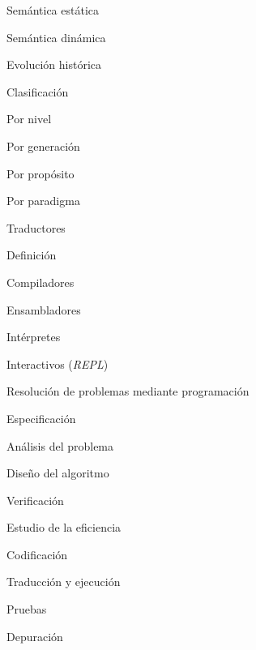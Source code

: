 \begin{longenum}
\begin{longenum}
\begin{longenum}
\begin{longenum}
\begin{longenum}
                \end{longenum}
                \item Semántica estática
                \item Semántica dinámica
            \end{longenum}
            \item Evolución histórica
            \item Clasificación
            \begin{longenum}
                \item Por nivel
                \item Por generación
                \item Por propósito
                \item Por paradigma
            \end{longenum}
        \end{longenum}
        \item Traductores
        \begin{longenum}
            \item Definición
            \item Compiladores
            \begin{longenum}
                \item Ensambladores
            \end{longenum}
            \item Intérpretes
            \begin{longenum}
                \item Interactivos (\textit{REPL})
            \end{longenum}
        \end{longenum}
        \item Resolución de problemas mediante programación
        \begin{longenum}
            \item Especificación
            \item Análisis del problema
            \item Diseño del algoritmo
            \item Verificación
            \item Estudio de la eficiencia
            \item Codificación
            \item Traducción y ejecución
            \item Pruebas
            \item Depuración

\end{longenum}
\end{longenum}
\end{longenum}
